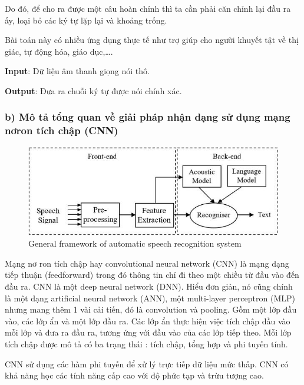 \documentclass{article}
\begin{document}
	Do đó, để cho ra được một câu hoàn chỉnh thì ta cần phải căn chỉnh lại đầu ra ấy, loại bỏ các ký tự lặp lại và khoảng trống.
	
	Bài toán này có nhiều ứng dụng thực tế như trợ giúp cho người khuyết tật về thị giác, tự động hóa, giáo dục,….
	
	\textbf{Input}: Dữ liệu âm thanh giọng nói thô.
	
	\textbf{Output}: Đưa ra chuỗi ký tự được nói chính xác.
	
	\subsubsection{b) Mô tả tổng quan về giải pháp nhận dạng sử dụng mạng nơron tích chập (CNN)}
	
	\begin{figure}[H]
		\centering
		\includegraphics[width=1\linewidth]{images/b3_1.png}
		\caption{General framework of automatic speech recognition system}
		\label{fig:writing-thesis}
	\end{figure}

	\qquad Mạng nơ ron tích chập hay convolutional neural network (CNN) là mạng dạng tiếp thuận (feedforward) trong đó thông tin chỉ đi theo một chiều từ đầu vào đến đầu ra. CNN là một deep neural network (DNN). Hiểu đơn giản, nó cũng chính là một dạng artificial neural network (ANN), một multi-layer perceptron (MLP) nhưng mang thêm 1 vài cải tiến, đó là convolution và pooling. Gồm một lớp đầu vào, các lớp ẩn và một lớp đầu ra. Các lớp ẩn thực hiện việc tích chập đầu vào mỗi lớp và đưa ra đầu ra, tương ứng với đầu vào của các lớp tiếp theo. Mỗi lớp tích chập được mô tả có ba trạng thái : tích chập, tổng hợp và phi tuyến tính.
	
	CNN sử dụng các hàm phi tuyến để xử lý trực tiếp dữ liệu mức thấp. CNN có khả năng học các tính năng cấp cao với độ phức tạp và trừu tượng cao. 
	
\end{document}
